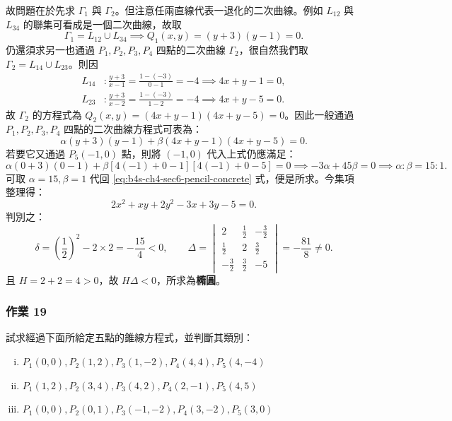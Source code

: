 \begin{solution}
故問題在於先求 $\Gamma_1$ 與 $\Gamma_2$。但注意任兩直線代表一退化的二次曲線。例如 $L_{12}$ 與 $L_{34}$ 的聯集可看成是一個二次曲線，故取
\[
\Gamma_1 = L_{12} \cup L_{34} \implies Q_1(x, y) = (y + 3)(y - 1) = 0.
\]
仍還須求另一也通過 $P_1, P_2, P_3, P_4$ 四點的二次曲線 $\Gamma_2$，很自然我們取 $\Gamma_2 = L_{14} \cup L_{23}$。則因
\[
\begin{aligned}
L_{14}&: \frac{y + 3}{x - 1} = \frac{1 - (-3)}{0 - 1} = -4 \implies 4x + y - 1 = 0, \\
L_{23}&: \frac{y + 3}{x - 2} = \frac{1 - (-3)}{1 - 2} = -4 \implies 4x + y - 5 = 0.
\end{aligned}
\]
故 $\Gamma_2$ 的方程式為 $Q_2(x, y) = (4x + y - 1)(4x + y - 5) = 0$。因此一般通過 $P_1, P_2, P_3, P_4$ 四點的二次曲線方程式可表為：
\begin{equation}
\alpha (y + 3)(y - 1) + \beta (4x + y - 1)(4x + y - 5) = 0.
\label{eq:b4s-ch4-sec6-pencil-concrete}
\end{equation}
若要它又通過 $P_5(-1, 0)$ 點，則將 $(-1, 0)$ 代入上式仍應滿足：
\[
\alpha(0 + 3)(0 - 1) + \beta[4(-1) + 0 - 1][4(-1) + 0 - 5] = 0 \implies -3\alpha + 45\beta = 0 \implies \alpha : \beta = 15 : 1.
\]
可取 $\alpha = 15, \beta = 1$ 代回 \eqref{eq:b4s-ch4-sec6-pencil-concrete} 式，便是所求。今集項整理得：
\[
2x^2 + xy + 2y^2 - 3x + 3y - 5 = 0.
\]
判別之：
\[
\delta = \left(\frac{1}{2}\right)^2 - 2 \times 2 = -\frac{15}{4} < 0, \qquad
\Delta = \begin{vmatrix} 2 & \frac{1}{2} & -\frac{3}{2} \\ \frac{1}{2} & 2 & \frac{3}{2} \\ -\frac{3}{2} & \frac{3}{2} & -5 \end{vmatrix} = -\frac{81}{8} \ne 0.
\]
且 $H = 2 + 2 = 4 > 0$，故 $H\Delta < 0$，所求為\textbf{橢圓}。
\end{solution}

\subsubsection*{作業 19}
試求經過下面所給定五點的錐線方程式，並判斷其類別：
\begin{enumerate}[(i)]
  \item $P_1(0, 0), P_2(1, 2), P_3(1, -2), P_4(4, 4), P_5(4, -4)$
  \item $P_1(1, 2), P_2(3, 4), P_3(4, 2), P_4(2, -1), P_5(4, 5)$
  \item $P_1(0, 0), P_2(0, 1), P_3(-1, -2), P_4(3, -2), P_5(3, 0)$
\end{enumerate}

